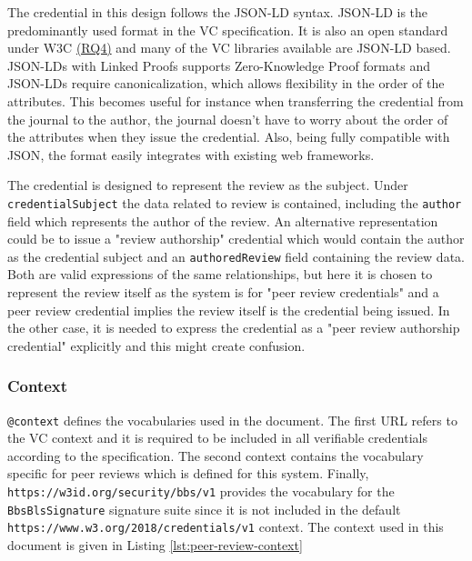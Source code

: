 The credential in this design follows the \acrshort{JSON-LD} syntax. \acrshort{JSON-LD} is the predominantly used format in the \acrshort{VC} specification. It is also an open standard under W3C \parencite{jsonld} \hyperref[rq:open-standards]{(RQ4)} and many of the \acrshort{VC} libraries available are \acrshort{JSON-LD} based.  \acrshort{JSON-LD}s with Linked Proofs supports Zero-Knowledge Proof formats and \acrshort{JSON-LD}s require canonicalization, which allows flexibility in the order of the attributes. This becomes useful for instance when transferring the credential from the journal to the author, the journal doesn't have to worry about the order of the attributes when they issue the credential. Also, being fully compatible with \acrshort{JSON}, the format easily integrates with existing web frameworks. 

The credential is designed to represent the review as the subject. Under \lstinline{credentialSubject} the data related to review is contained, including the \lstinline{author} field which represents the author of the review. An alternative representation could be to issue a "review authorship" credential which would contain the author as the credential subject and an \lstinline{authoredReview} field containing the review data. Both are valid expressions of the same relationships, but here it is chosen to represent the review itself as the system is for "peer review credentials" and a peer review credential implies the review itself is the credential being issued. In the other case, it is needed to express the credential as a "peer review authorship credential" explicitly and this might create confusion.

\subsubsection{Context}

\lstinline{@context} defines the vocabularies used in the document. The first \acrshort{URL} refers to the \acrshort{VC} context and it is required to be included in all verifiable credentials according to the specification. The second context contains the vocabulary specific for peer reviews which is defined for this system. Finally, \lstinline{https://w3id.org/security/bbs/v1} provides the vocabulary for the \lstinline{BbsBlsSignature} signature suite since it is not included in the default \lstinline{https://www.w3.org/2018/credentials/v1} context. The context used in this document is given in Listing \ref{lst:peer-review-context}


